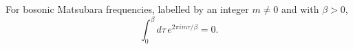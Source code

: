 \documentclass{article}
\begin{document}
For bosonic Matsubara frequencies, labelled by an integer $m \neq 0$ and with $\beta>0$,
\begin{equation}
\int_0^{\beta} d\tau\, e^{2\pi i m\tau/\beta} = 0 .
\label{eq:bos}
\end{equation}
\end{document}
